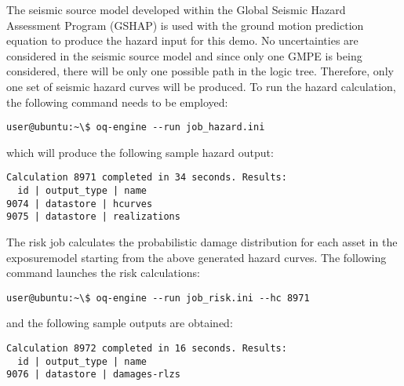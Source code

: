 The seismic source model developed within the Global Seismic Hazard Assessment
Program (GSHAP) is used with the \cite{chiou2008} ground motion prediction
equation to produce the hazard input for this demo. No uncertainties are
considered in the seismic source model and since only one GMPE is being
considered, there will be only one possible path in the logic tree. Therefore,
only one set of seismic hazard curves will be produced. To run the hazard
calculation, the following command needs to be employed:

\begin{verbatim}
user@ubuntu:~\$ oq-engine --run job_hazard.ini
\end{verbatim}

which will produce the following sample hazard output:

\begin{verbatim}
Calculation 8971 completed in 34 seconds. Results:
  id | output_type | name
9074 | datastore | hcurves
9075 | datastore | realizations
\end{verbatim}

The risk job calculates the probabilistic damage distribution for each asset
in the \gls{exposuremodel} starting from the above generated hazard curves. The
following command launches the risk calculations:

\begin{verbatim}
user@ubuntu:~\$ oq-engine --run job_risk.ini --hc 8971
\end{verbatim}

and the following sample outputs are obtained:

\begin{verbatim}
Calculation 8972 completed in 16 seconds. Results:
  id | output_type | name
9076 | datastore | damages-rlzs
\end{verbatim}
